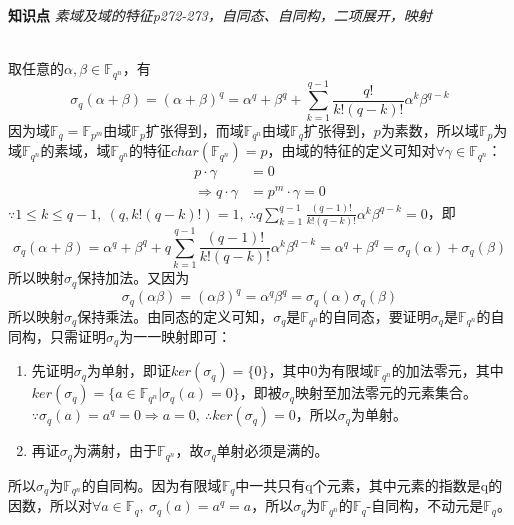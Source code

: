 \begin{tcolorbox}
    \textbf{知识点} 
    \textit{素域及域的特征p272-273，自同态、自同构，二项展开，映射}
\end{tcolorbox}
\begin{solution}\ \\
    取任意的$\alpha, \beta\in\mathbb{F}_{q^n}$，有
    \begin{equation*}
        \sigma_q(\alpha+\beta)=(\alpha+\beta)^q=\alpha^q+\beta^q+\sum\limits_{k=1}^{q-1}\frac{q!}{k!(q-k)!}\alpha^k\beta^{q-k}
    \end{equation*}
    因为域$\mathbb{F}_{q}=\mathbb{F}_{p^m}$由域$\mathbb{F}_{p}$扩张得到，而域$\mathbb{F}_{q^n}$由域$\mathbb{F}_{q}$扩张得到，$p$为素数，所以域$\mathbb{F}_{p}$为域$\mathbb{F}_{q^n}$的素域，域$\mathbb{F}_{q^n}$的特征$char(\mathbb{F}_{q^n})=p$，由域的特征的定义可知对$\forall\gamma\in\mathbb{F}_{q^n}$：
    \begin{equation*}
        \begin{aligned}
            p\cdot\gamma&=0\\ \Rightarrow q\cdot\gamma&=p^m\cdot\gamma=0
        \end{aligned}
    \end{equation*}
    $\because1\leq k\leq q-1,\ (q, k!(q-k)!)=1,\ \therefore q\sum\limits_{k=1}^{q-1}\frac{(q-1)!}{k!(q-k)!}\alpha^k\beta^{q-k}=0$，即
    \begin{equation*}
        \sigma_q(\alpha+\beta)=\alpha^q+\beta^q+q\sum\limits_{k=1}^{q-1}\frac{(q-1)!}{k!(q-k)!}\alpha^k\beta^{q-k}=\alpha^q+\beta^q=\sigma_q(\alpha)+\sigma_q(\beta)
    \end{equation*}
    所以映射$\sigma_q$保持加法。又因为
    \begin{equation*}
        \sigma_q(\alpha\beta)=(\alpha\beta)^q=\alpha^q\beta^q=\sigma_q(\alpha)\sigma_q(\beta)
    \end{equation*}
    所以映射$\sigma_q$保持乘法。由同态的定义可知，$\sigma_q$是$\mathbb{F}_{q^n}$的自同态，要证明$\sigma_q$是$\mathbb{F}_{q^n}$的自同构，只需证明$\sigma_q$为一一映射即可：
    \begin{enumerate}
        \item 先证明$\sigma_q$为单射，即证$ker(\sigma_q)=\{0\}$，其中0为有限域$\mathbb{F}_{q^n}$的加法零元，其中$ker(\sigma_q)=\{a\in\mathbb{F}_{q^n}|\sigma_q(a)=0\}$，即被$\sigma_q$映射至加法零元的元素集合。\\
        $\because\sigma_q(a)=a^q=0\Rightarrow a=0,\ \therefore ker(\sigma_q)={0}$，所以$\sigma_q$为单射。
        \item 再证$\sigma_q$为满射，由于$\mathbb{F}_{q^n}$，故$\sigma_q$单射必须是满的。
    \end{enumerate}
    所以$\sigma_q$为$\mathbb{F}_{q^n}$的自同构。因为有限域$\mathbb{F}_{q}$中一共只有q个元素，其中元素的指数是q的因数，所以对$\forall a\in\mathbb{F}_{q},\ \sigma_q(a)=a^q=a$，所以$\sigma_q$为$\mathbb{F}_{q^n}$的$\mathbb{F}_{q}$-自同构，不动元是$\mathbb{F}_{q}$。
\end{solution}